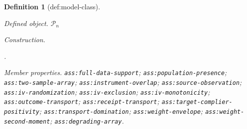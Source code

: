 \documentclass{article}
\newtheorem{definition}{Definition}
\begin{document}
\begin{definition}[def:model-class]\label{def:model-class}
\par\smallskip\noindent\emph{Defined object.} \(\mathcal P_n\)
\par\smallskip\noindent\emph{Construction.} \par\noindent {}\par\noindent.
\par\smallskip\noindent\emph{Member properties.} \texttt{ass:\allowbreak{}full-\allowbreak{}data-\allowbreak{}support}; \texttt{ass:\allowbreak{}population-\allowbreak{}presence}; \texttt{ass:\allowbreak{}two-\allowbreak{}sample-\allowbreak{}array}; \texttt{ass:\allowbreak{}instrument-\allowbreak{}overlap}; \texttt{ass:\allowbreak{}source-\allowbreak{}observation}; \texttt{ass:\allowbreak{}iv-\allowbreak{}randomization}; \texttt{ass:\allowbreak{}iv-\allowbreak{}exclusion}; \texttt{ass:\allowbreak{}iv-\allowbreak{}monotonicity}; \texttt{ass:\allowbreak{}outcome-\allowbreak{}transport}; \texttt{ass:\allowbreak{}receipt-\allowbreak{}transport}; \texttt{ass:\allowbreak{}target-\allowbreak{}complier-\allowbreak{}positivity}; \texttt{ass:\allowbreak{}transport-\allowbreak{}domination}; \texttt{ass:\allowbreak{}weight-\allowbreak{}envelope}; \texttt{ass:\allowbreak{}weight-\allowbreak{}second-\allowbreak{}moment}; \texttt{ass:\allowbreak{}degrading-\allowbreak{}array}.
\end{definition}
\end{document}
